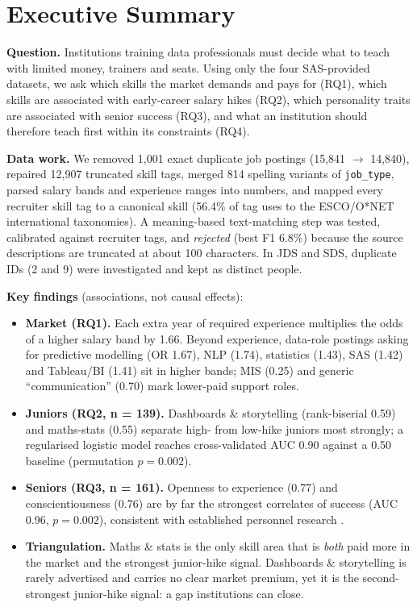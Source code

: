 \section*{Executive Summary}

\textbf{Question.} Institutions training data professionals must decide what to teach with limited
money, trainers and seats. Using only the four SAS-provided datasets, we ask which skills the
market demands and pays for (RQ1), which skills are associated with early-career salary hikes
(RQ2), which personality traits are associated with senior success (RQ3), and what an
institution should therefore teach first within its constraints (RQ4).

\textbf{Data work.} We removed 1,001 exact duplicate job postings (15,841 $\rightarrow$ 14,840),
repaired 12,907 truncated skill tags, merged 814 spelling variants of \texttt{job\_type},
parsed salary bands and experience ranges into numbers, and mapped every recruiter skill tag to a
canonical skill (56.4\% of tag uses to the ESCO/O*NET international taxonomies). A
meaning-based text-matching step was tested, calibrated against recruiter tags, and
\emph{rejected} (best F1 6.8\%) because the source descriptions are truncated at about 100
characters. In JDS and SDS, duplicate IDs (2 and 9) were investigated and kept as distinct people.

\textbf{Key findings} (associations, not causal effects):
\begin{itemize}
  \item \textbf{Market (RQ1).} Each extra year of required experience multiplies the odds of a
        higher salary band by 1.66. Beyond experience, data-role postings asking for
        predictive modelling (OR 1.67), NLP (1.74), statistics (1.43), SAS (1.42) and Tableau/BI
        (1.41) sit in higher bands; MIS (0.25) and generic ``communication'' (0.70) mark
        lower-paid support roles.
  \item \textbf{Juniors (RQ2, n = 139).} Dashboards \& storytelling (rank-biserial 0.59) and
        maths-stats (0.55) separate high- from low-hike juniors most strongly; a regularised
        logistic model reaches cross-validated AUC 0.90 against a 0.50 baseline
        (permutation $p = 0.002$).
  \item \textbf{Seniors (RQ3, n = 161).} Openness to experience (0.77) and conscientiousness
        (0.76) are by far the strongest correlates of success (AUC 0.96, $p = 0.002$),
        consistent with established personnel research \citep{barrick1991}.
  \item \textbf{Triangulation.} Maths \& stats is the only skill area that is \emph{both} paid
        more in the market and the strongest junior-hike signal. Dashboards \& storytelling is
        rarely advertised and carries no clear market premium, yet it is the second-strongest
        junior-hike signal: a gap institutions can close.
\end{itemize}

